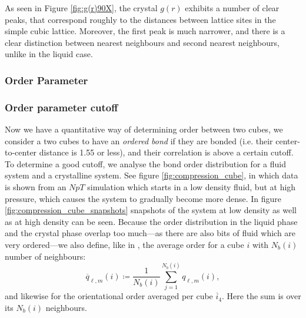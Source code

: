 \documentclass[thesis]{subfiles}
\begin{document}
As seen in Figure \ref{fig:g(r)90X}, the crystal $g(r)$ exhibits a number of clear peaks, that correspond roughly to the distances between lattice sites in the simple cubic lattice. Moreover, the first peak is much narrower, and there is a clear distinction between nearest neighbours and second nearest neighbours, unlike in the liquid case. 


\subsubsection{Order Parameter} \label{subsec:order}

\subsubsection{Order parameter cutoff} \label{subsubsec:order param cutoff}

Now we have a quantitative way of determining order between two cubes, we consider a two cubes to have an \emph{ordered bond} if they are bonded (i.e. their center-to-center distance is 1.55 or less), and their correlation is above a certain cutoff. To determine a good cutoff, we analyse the bond order distribution for a fluid system and a crystalline system. See figure \ref{fig:compression_cube}, in which data is shown from an $NpT$ simulation which starts in a low density fluid, but at high pressure, which causes the system to gradually become more dense. In figure \ref{fig:compression_cube_snapshots} snapshots of the system at low density as well as at high density can be seen. Because the order distribution in the liquid phase and the crystal phase overlap too much---as there are also bits of fluid which are very ordered---we also define, like in \cite{lechner2008accurate}, the average order for a cube $i$ with $N_b(i)$ number of neighbours:
\begin{equation}
\overline q_{\ell, m}(i) \coloneqq \frac{1}{N_b(i)} \sum_{j = 1}^{N_b(i)}q_{\ell, m}(i),
\end{equation}
and likewise for the orientational order averaged per cube $\overline i_4$. Here the sum is over its $N_b(i)$ neighbours.
\end{document}
